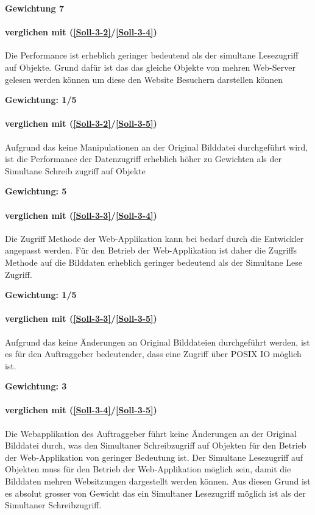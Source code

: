 \textbf{Gewichtung 7}

\paragraph*{ verglichen mit  (\ref{Soll-3-2}/\ref{Soll-3-4})}
Die Performance ist erheblich geringer bedeutend als der simultane Lesezugriff auf Objekte. Grund dafür ist das das gleiche Objekte von mehren Web-Server gelesen werden können um diese den Website Besuchern darstellen können 

\textbf{Gewichtung: 1/5}

\paragraph*{ verglichen mit  (\ref{Soll-3-2}/\ref{Soll-3-5})}
Aufgrund das keine Manipulationen an der Original Bilddatei durchgeführt wird, ist die Performance der Datenzugriff erheblich höher zu Gewichten als der Simultane Schreib zugriff auf Objekte 

\textbf{Gewichtung: 5}


\paragraph*{ verglichen mit  (\ref{Soll-3-3}/\ref{Soll-3-4})}
Die Zugriff Methode der Web-Applikation kann bei bedarf durch die Entwickler angepasst werden. Für den Betrieb der Web-Applikation ist daher die Zugriffs Methode auf die Bilddaten erheblich geringer bedeutend als der Simultane Lese Zugriff.

\textbf{Gewichtung: 1/5}


\paragraph*{ verglichen mit  (\ref{Soll-3-3}/\ref{Soll-3-5})}
 Aufgrund das keine Änderungen an Original Bilddateien durchgeführt werden, ist es für den Auftraggeber bedeutender, dass eine Zugriff über POSIX IO möglich ist.

\textbf{Gewichtung: 3}


\paragraph*{ verglichen mit  (\ref{Soll-3-4}/\ref{Soll-3-5})}
Die Webapplikation des Auftraggeber führt keine Änderungen an der Original Bilddatei durch, was den Simultaner Schreibzugriff auf Objekten für den Betrieb der Web-Applikation von geringer Bedeutung ist. Der Simultane Lesezugriff auf Objekten muss für den Betrieb der Web-Applikation möglich sein, damit die Bilddaten mehren Websitzungen dargestellt werden können. Aus diesen Grund ist es absolut grosser von Gewicht das ein Simultaner Lesezugriff möglich ist als der Simultaner Schreibzugriff.

